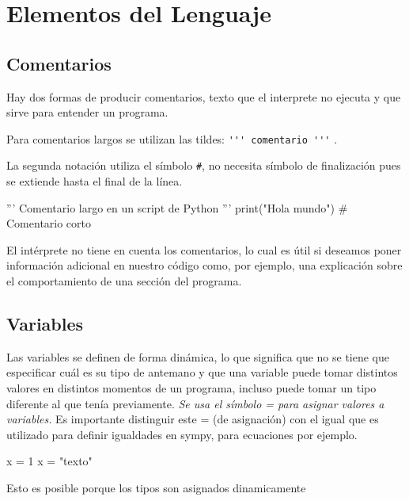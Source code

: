 \section{Elementos del Lenguaje}

\subsection{Comentarios}

Hay dos formas de producir comentarios, texto que el interprete  no ejecuta y que sirve para entender un programa.

Para comentarios largos se utilizan las tildes: \linebreak\verb~''' comentario '''~ .


 La segunda notación utiliza el símbolo \verb~#~, no necesita símbolo de finalización 
 pues se extiende hasta el final de la línea.

 \begin{pyverbatim}
'''
Comentario  largo en un script de Python
'''
print("Hola mundo") # Comentario corto
\end{pyverbatim}




El intérprete no tiene en cuenta los comentarios, lo cual es útil si deseamos poner información adicional en nuestro código como, por ejemplo, una explicación sobre el comportamiento de una sección del programa.








\subsection{Variables}
Las variables se definen de forma dinámica, lo que significa que no se tiene que especificar cuál es su tipo de antemano y que una variable puede tomar distintos valores en distintos momentos de un programa, incluso puede tomar
 un tipo diferente al que tenía previamente. \emph{Se usa el símbolo = para asignar valores a variables.}
 Es importante distinguir este = (de asignación) con el igual que es utilizado para definir igualdades en sympy, para ecuaciones por ejemplo.



\begin{pyverbatim}
x = 1
x = "texto" 
\end{pyverbatim}
Esto es posible porque los tipos son asignados
dinamicamente

